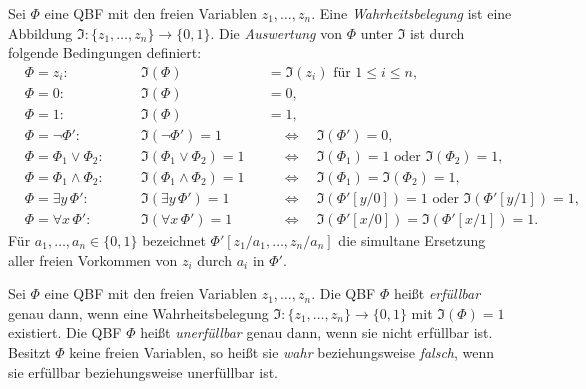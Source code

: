 \begin{Definition}
    \label{def:qbf-evaluation}
    Sei \(\Phi\) eine QBF mit den freien
    Variablen \(z_1,\dots,z_n\). Eine \emph{Wahrheitsbelegung} ist eine
    Abbildung
    \(
        \mathfrak{I}\colon
        \{z_1,\dots,z_n\}\to\{0,1\}.
    \)
    Die \emph{Auswertung} von \(\Phi\) unter \(\mathfrak{I}\) ist durch
    folgende Bedingungen definiert:
    \[
    \begin{alignedat}{3}
        &\Phi=z_i\colon
        \quad 
        &&\mathfrak{I}(\Phi)
        &&=\mathfrak{I}(z_i)
        \text{ für }1\leq i\leq n,\\
        &\Phi=0\colon
        \quad 
        &&\mathfrak{I}(\Phi)
        &&=0,\\
        &\Phi=1\colon
        \quad 
        &&\mathfrak{I}(\Phi)
        &&=1,\\
        &\Phi=\neg\Phi'\colon
        \quad 
        &&\mathfrak{I}(\neg\Phi')=1
        &&\quad\Longleftrightarrow\quad
        \mathfrak{I}(\Phi')=0,\\
        &\Phi=\Phi_1\lor\Phi_2\colon
        \quad 
        &&\mathfrak{I}(\Phi_1\lor\Phi_2)=1
        &&\quad\Longleftrightarrow\quad
        \mathfrak{I}(\Phi_1)=1
        \text{ oder }\mathfrak{I}(\Phi_2)=1,\\
        &\Phi=\Phi_1\land\Phi_2\colon
        \quad 
        &&\mathfrak{I}(\Phi_1\land\Phi_2)=1
        &&\quad\Longleftrightarrow\quad
        \mathfrak{I}(\Phi_1)=\mathfrak{I}(\Phi_2)=1,\\
        &\Phi=\exists y\,\Phi'\colon
        \quad 
        &&\mathfrak{I}(\exists y\,\Phi')=1
        &&\quad\Longleftrightarrow\quad
        \mathfrak{I}(\Phi'[y/0])=1
        \text{ oder }\mathfrak{I}(\Phi'[y/1])=1,\\
        &\Phi=\forall x\,\Phi'\colon
        \quad 
        &&\mathfrak{I}(\forall x\,\Phi')=1
        &&\quad\Longleftrightarrow\quad
        \mathfrak{I}(\Phi'[x/0])
        =\mathfrak{I}(\Phi'[x/1])=1.
    \end{alignedat}
    \]
    Für \(a_1,\dots,a_n\in\{0,1\}\) bezeichnet
    \(
        \Phi'[z_1/a_1,\dots,z_n/a_n]
    \)
    die simultane Ersetzung aller freien Vorkommen von \(z_i\) durch
    \(a_i\) in \(\Phi'\).
\end{Definition}

\begin{Definition}
    \label{def:qbf-satisfiability}
    Sei \(\Phi\) eine QBF mit den freien Variablen
    \(z_1,\dots,z_n\). Die QBF \(\Phi\) heißt \emph{erfüllbar} genau
    dann, wenn eine Wahrheitsbelegung
    \(\mathfrak{I}\colon\{z_1,\dots,z_n\}\to\{0,1\}\) mit
    \(\mathfrak{I}(\Phi)=1\) existiert. Die QBF \(\Phi\) heißt
    \emph{unerfüllbar} genau dann, wenn sie nicht erfüllbar ist.
    Besitzt \(\Phi\) keine freien Variablen, so heißt sie \emph{wahr}
    beziehungsweise \emph{falsch}, wenn sie erfüllbar beziehungsweise
    unerfüllbar ist.
\end{Definition}

